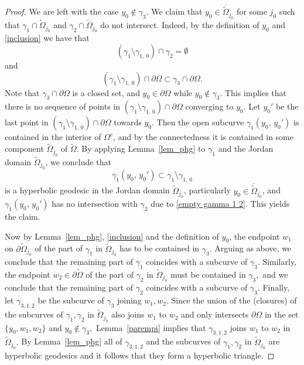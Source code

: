 \documentclass[reqno,11pt]{amsart}
\def\wz{\widetilde}
\numberwithin{equation}{section}
\theoremstyle{remark}
\begin{document}
\begin{proof}


We are left with the case $y_0\notin \gamma_3.$ We
claim that
$y_0\in \overline{\wz \Omega}_{j_0}$ for some $j_0$ such that 
$\gamma_1\cap \wz \Omega_{j_0}$ and $\gamma_2\cap \wz \Omega_{j_0}$ do not intersect. 
Indeed, by the definition of $y_0$ and  \eqref{inclusion}
we have that
\begin{equation}\label{empty gamma 1 2}
    (\gamma_1 \setminus \gamma_{1,\,0}) \cap \gamma_2=\emptyset 
\end{equation}
and 
$$(\gamma_1 \setminus \gamma_{1,\,0}) \cap \partial \Omega\subset \gamma_3\cap \partial \Omega. $$
Note that $\gamma_3 \cap \partial \Omega$ is a closed set, and $y_0 \in \partial \Omega$ while $y_0 \notin \gamma_3$. This implies that there is no sequence of points in $(\gamma_1 \setminus \gamma_{1,\,0}) \cap \partial \Omega$ converging to $y_0$. 
Let $y_0'$ be the last point in $(\gamma_1 \setminus \gamma_{1,\,0}) \cap \partial \Omega$  towards $y_0$. Then the open subcurve $\gamma_1(y_0,\,y_0')$ is contained in the interior of $\Omega^c$, and by the connectedness it is contained in some component $\wz \Omega_{j_0}$ of $\wz \Omega$. 
 By applying Lemma~\ref{lem_phg} to $\gamma_1$ and the Jordan domain ${\wz \Omega}_{j_0}$, we conclude that 
$$\gamma_1(y_0,\,y_0')\subset \gamma_1 \setminus \gamma_{1,\,0}$$
is a hyperbolic geodesic in the Jordan domain ${\wz \Omega}_{j_0}$, particularly $y_0\in \overline{\wz \Omega}_{j_0}$, and  
$\gamma_1(y_0,\,y_0')$
has no intersection with  $\gamma_2$ due to \eqref{empty gamma 1 2}. This yields the claim. 

Now by  Lemma~\ref{lem_phg}, \eqref{inclusion} and the definition of $y_0$, 
the endpoint $w_1$ on $\partial \wz \Omega_{j_0}$ of the part of $\gamma_1$ in 
$\wz \Omega_{j_0}$ has to be contained in $\gamma_3.$ Arguing as above,
we conclude that the remaining part of $\gamma_1$ coincides with a subcurve
of $\gamma_3.$ Similarly, the endpoint $w_2 \in \partial \wz \Omega$  
of the part of $\gamma_2$ in $\wz \Omega_{j_0}$ must be contained in  $\gamma_3,$
and we conclude that the remaining part of $\gamma_2$ coincides with a subcurve
of $\gamma_3.$ Finally, let $\gamma_{3,1,2}$ be the subcurve of $\gamma_3$ 
joining $w_1,w_2.$ Since the union of the (closures) of the subcurves
of $\gamma_1,\gamma_2$ in  $\wz \Omega_{j_0}$ also joins $w_1$ to $w_2$ and only
intersects $\partial \Omega$ in the set $\{y_0,w_1,w_2\}$ and $y_0\notin
\gamma_3,$ Lemma~\ref{parempi} implies that $\gamma_{3,1,2}$ joins $w_1$ to $w_2$ in 
$\wz \Omega_{j_0}.$
By Lemma~\ref{lem_phg} all of $\gamma_{3,1,2}$ and the subcurves
of $\gamma_1,\gamma_2$ in  $\wz \Omega_{j_0}$ are hyperbolic geodesics and it
follows that they form a hyperbolic triangle.


\end{proof}
\end{document}
